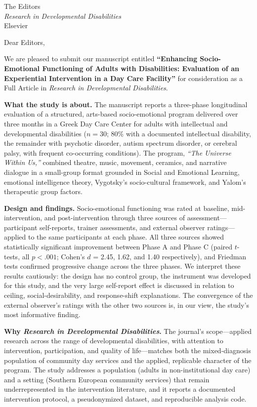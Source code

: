 \documentclass[12pt,a4paper]{letter}
\date{\today}
\begin{document}
\begin{letter}{The Editors\\
\textit{Research in Developmental Disabilities}\\
Elsevier}

\opening{Dear Editors,}

We are pleased to submit our manuscript entitled \textbf{``Enhancing
Socio-Emotional Functioning of Adults with Disabilities: Evaluation of an
Experiential Intervention in a Day Care Facility''} for consideration as a
Full Article in \textit{Research in Developmental Disabilities}.

\textbf{What the study is about.}
The manuscript reports a three-phase longitudinal evaluation of a structured,
arts-based socio-emotional program delivered over three months in a Greek Day
Care Center for adults with intellectual and developmental disabilities
($n = 30$; 80\% with a documented intellectual disability, the remainder with
psychotic disorder, autism spectrum disorder, or cerebral palsy, with frequent
co-occurring conditions). The program, \textit{``The Universe Within Us,''}
combined theatre, music, movement, ceramics, and narrative dialogue in a small-group
format grounded in Social and Emotional Learning, emotional intelligence theory,
Vygotsky's socio-cultural framework, and Yalom's therapeutic group factors.

\textbf{Design and findings.}
Socio-emotional functioning was rated at baseline, mid-intervention, and
post-intervention through three sources of assessment---participant
self-reports, trainer assessments, and external observer ratings---applied
to the same participants at each phase. All three sources showed
statistically significant improvement between Phase A and Phase C
(paired $t$-tests, all $p < .001$; Cohen's $d$ = 2.45, 1.62, and 1.40
respectively), and Friedman tests confirmed progressive change across the three
phases. We interpret these results cautiously: the design has no control group,
the instrument was developed for this study, and the very large self-report
effect is discussed in relation to ceiling, social-desirability, and
response-shift explanations. The convergence of the external observer's ratings
with the other two sources is, in our view, the study's most informative
finding.

\textbf{Why \textit{Research in Developmental Disabilities}.}
The journal's scope---applied research across the range of developmental
disabilities, with attention to intervention, participation, and quality of
life---matches both the mixed-diagnosis population of community day services
and the applied, replicable character of the program. The study addresses a
population (adults in non-institutional day care) and a setting (Southern
European community services) that remain underrepresented in the intervention
literature, and it reports a documented intervention protocol, a pseudonymized
dataset, and reproducible analysis code.


\end{letter}
\end{document}
